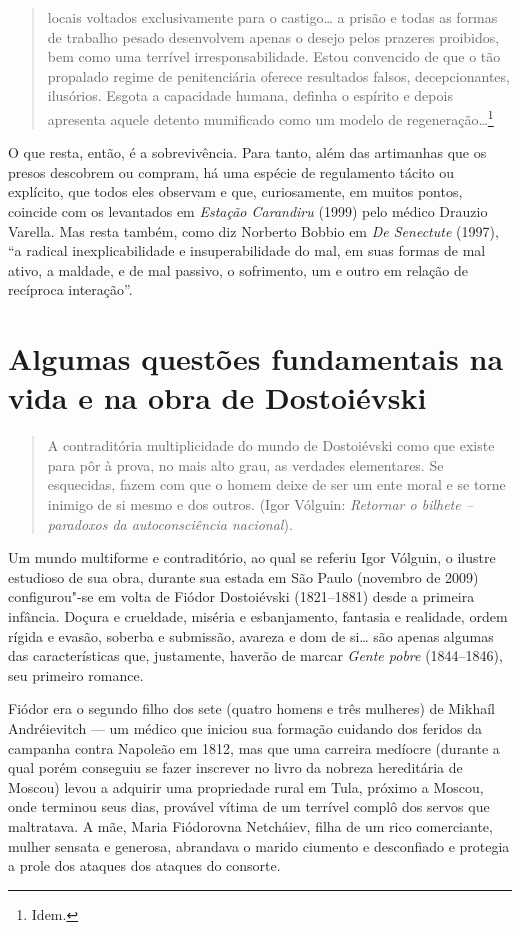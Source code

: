 \begin{quote}
locais voltados exclusivamente para o castigo\ldots{} a prisão e todas
as formas de trabalho pesado desenvolvem apenas o desejo pelos prazeres
proibidos, bem como uma terrível irresponsabilidade. Estou convencido de
que o tão propalado regime de penitenciária oferece resultados falsos,
decepcionantes, ilusórios. Esgota a capacidade humana, definha o espírito
e depois apresenta aquele detento mumificado como um modelo de
regeneração\ldots{}\footnote{Idem.}
\end{quote}

O que resta, então, é a sobrevivência. Para tanto, além das artimanhas
que os presos descobrem ou compram, há uma espécie de regulamento tácito
ou explícito, que todos eles observam e que, curiosamente, em muitos pontos, coincide com
os levantados em \emph{Estação Carandiru} (1999) pelo médico Drauzio
Varella. Mas resta também, como diz Norberto Bobbio em \emph{De
Senectute} (1997), ``a radical inexplicabilidade e insuperabilidade do
mal, em suas formas de mal ativo, a maldade, e de mal passivo, o
sofrimento, um e outro em relação de recíproca interação''.

\chapter{Algumas questões fundamentais na vida e na obra de Dostoiévski}

\begin{quote}
A contraditória multiplicidade do mundo de Dostoiévski como
que existe para pôr à prova, no mais alto grau, as verdades elementares.
Se esquecidas, fazem com que o homem deixe de ser um ente moral e se
torne inimigo de si mesmo e dos outros. (Igor Vólguin: \emph{Retornar o bilhete -- paradoxos da autoconsciência
nacional}).
\end{quote}


Um mundo multiforme e contraditório, ao qual se referiu Igor Vólguin,
o ilustre estudioso de sua obra, durante sua estada em São Paulo
(novembro de 2009) configurou"-se em volta de Fiódor Dostoiévski
(1821--1881) desde a primeira infância. Doçura e crueldade, miséria e
esbanjamento, fantasia e realidade, ordem rígida e evasão, soberba e
submissão, avareza e dom de si\ldots{} são apenas algumas das características
que, justamente, haverão de marcar \emph{Gente pobre} (1844--1846), seu
primeiro romance.

Fiódor era o segundo filho dos sete (quatro homens e três mulheres) de
Mikhaíl Andréievitch --- um médico que iniciou sua formação cuidando dos
feridos da campanha contra Napoleão em 1812, mas que uma carreira
medíocre (durante a qual porém conseguiu se fazer inscrever no livro da
nobreza hereditária de Moscou) levou a adquirir uma propriedade rural em
Tula, próximo a Moscou, onde terminou seus dias, provável vítima de um terrível
complô dos servos que maltratava. A mãe, Maria Fiódorovna Netcháiev,
filha de um rico comerciante, mulher sensata e generosa, abrandava o
marido ciumento e desconfiado e protegia a prole dos ataques dos ataques do
consorte.

